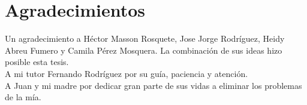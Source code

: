 \chapter*{Agradecimientos}\label{chapter:agradecimientos}

Un agradecimiento a Héctor Masson Rosquete, Jose Jorge Rodríguez, Heidy Abreu Fumero y Camila Pérez Mosquera. La combinación de sus ideas hizo posible esta tesis.\\

A mi tutor Fernando Rodríguez por su guía, paciencia y atención.\\

A Juan y mi madre por dedicar gran parte de sus vidas a eliminar los problemas de la mía.\\





